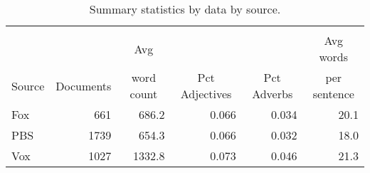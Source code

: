 \begin{table}[H]
    \centering
    \begin{tabular}{|l|r|r|r|r|r|} \hline
             &                                &                                 &                                       &                                        &                                            \\
             &                                & \multicolumn{1}{c|}{Avg}        &                                       &                                        & \multicolumn{1}{c|}{Avg words}             \\
    Source   & \multicolumn{1}{c|}{Documents} & \multicolumn{1}{c|}{word count} & \multicolumn{1}{c|}{Pct Adjectives}   & \multicolumn{1}{c|}{Pct Adverbs}       & \multicolumn{1}{c|}{per sentence}          \\ \hline \hline
    Fox      & 661                            & 686.2                           & 0.066                                 & 0.034                                  & 20.1                                       \\
    PBS      & 1739                           & 654.3                           & 0.066                                 & 0.032                                  & 18.0                                       \\
    Vox      & 1027                           & 1332.8                          & 0.073                                 & 0.046                                  & 21.3                                       \\ \hline  
    \end{tabular}
    \caption{Summary statistics by data by source. }
    \label{tab:summary}
\end{table}
